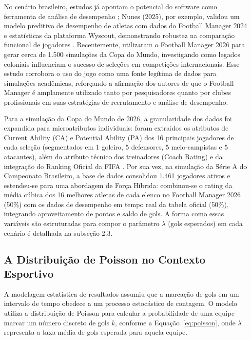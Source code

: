 \documentclass[12pt]{article}
\begin{document}
No cenário brasileiro, estudos já apontam o potencial do software como ferramenta de análise de desempenho \cite{costa2015football}; Nunes (2025), por exemplo, validou um modelo preditivo de desempenho de atletas com dados do Football Manager 2024 e estatísticas da plataforma Wyscout, demonstrando robustez na comparação funcional de jogadores \cite{nunes2025modelos}. Recentemente, \cite{da2026football} utilizaram o Football Manager 2026 para gerar cerca de 1.500 simulações da Copa do Mundo, investigando como legados coloniais influenciam o sucesso de seleções em competições internacionais. Esse estudo corrobora o uso do jogo como uma fonte legítima de dados para simulações acadêmicas, reforçando a afirmação dos autores de que o Football Manager é amplamente utilizado tanto por pesquisadores quanto por clubes profissionais em suas estratégias de recrutamento e análise de desempenho.

Para a simulação da Copa do Mundo de 2026, a granularidade dos dados foi expandida para microatributos individuais: foram extraídos os atributos de Current Ability (CA) e Potential Ability (PA) dos 16 principais jogadores de cada seleção (segmentados em 1 goleiro, 5 defensores, 5 meio-campistas e 5 atacantes), além do atributo técnico dos treinadores (Coach Rating) e da integração do Ranking Oficial da FIFA \cite{band2026ranking}. Por sua vez, na simulação da Série A do Campeonato Brasileiro, a base de dados consolidou 1.461 jogadores ativos e estendeu-se para uma abordagem de Força Híbrida: combinou-se o rating da média cúbica dos 16 melhores atletas de cada elenco no Football Manager 2026 \cite{fm2026} (50\%) com os dados de desempenho em tempo real da tabela oficial (50\%), integrando aproveitamento de pontos e saldo de gols. A forma como essas variáveis são estruturadas para compor o parâmetro $\lambda$ (gols esperados) em cada cenário é detalhada na subseção 2.3.

\subsection{A Distribuição de Poisson no Contexto Esportivo}
A modelagem estatística de resultados assumiu que a marcação de gols em um intervalo de tempo obedece a um processo estocástico de contagem. O modelo utiliza a distribuição de Poisson \cite{maher1982, dixon1997} para calcular a probabilidade de uma equipe marcar um número discreto de gols $k$, conforme a Equação~\ref{eq:poisson}, onde $\lambda$ representa a taxa média de gols esperada para aquela equipe.
\end{document}
